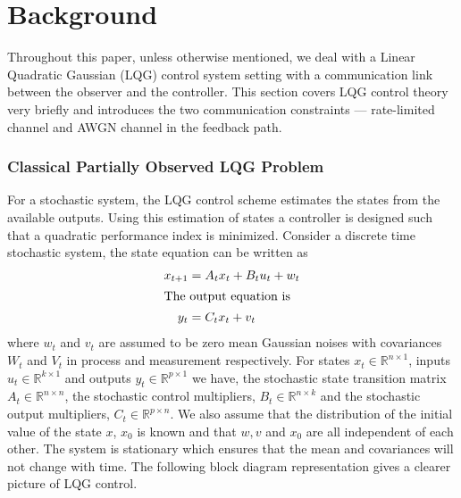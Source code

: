 \documentclass[12pt]{caltech_thesis_finalreport}
\begin{document}
\chapter{Background}
Throughout this paper, unless otherwise mentioned, we deal with a Linear Quadratic Gaussian (LQG) control system setting with a communication link between the observer and the controller. This section covers LQG control theory very briefly and introduces the two communication constraints --- rate-limited channel and AWGN channel in the feedback path.

	\subsection{Classical Partially Observed LQG Problem}
	For a stochastic system, the LQG control scheme estimates the states from the available outputs. Using this estimation of states a controller is designed such that a quadratic performance index is minimized. Consider a discrete time stochastic system, the state equation can be written as
	\begin{align}
	\label{systemeq}
	x_{t+1} &= A_{t}x_{t}+ B_{t}u_{t} + w_{t}\\
	\intertext{The output equation is}
	y_{t}&=C_{t}x_{t}+v_{t}
	\end{align}
	where $w_{t}$ and $v_{t}$ are assumed to be zero mean Gaussian noises with covariances $W_{t}$ and $V_{t}$ in process and measurement respectively. For states $x_{t} \in \mathbb{R}^{n \times 1}$, inputs $u_{t} \in \mathbb{R}^{k \times 1}$ and outputs $y_{t} \in \mathbb{R}^{p \times 1}$ we have, the stochastic state transition matrix $A_{t} \in \mathbb{R}^{n \times n}$, the stochastic control multipliers, $B_{t} \in \mathbb{R}^{n \times k}$ and the stochastic output multipliers, $C_{t} \in \mathbb{R}^{p \times n}$. We also assume that the distribution of the initial value of the state $x$, $x_{0}$ is known and that $w,v$ and $x_{0}$ are all independent of each other. The system is stationary which ensures that the mean and covariances will not change with time. The following block diagram representation gives a clearer picture of LQG control.
\end{document}
